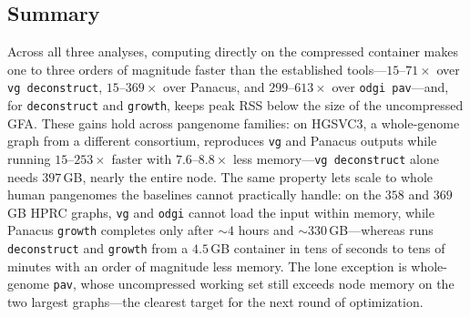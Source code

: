 \subsection*{Summary}

Across all three analyses, computing directly on the compressed container makes
\gfaz one to three orders of magnitude faster than the established tools---$15$--$71\times$
over \texttt{vg deconstruct}, $15$--$369\times$ over Panacus, and $299$--$613\times$
over \texttt{odgi pav}---and, for \texttt{deconstruct} and \texttt{growth}, keeps
peak RSS below the size of the uncompressed GFA. These gains hold across pangenome
families: on HGSVC3, a whole-genome graph from a different consortium, \gfaz
reproduces \texttt{vg} and Panacus outputs while running $15$--$253\times$ faster
with $7.6$--$8.8\times$ less memory---\texttt{vg deconstruct} alone needs $397$\,GB,
nearly the entire node. The same property lets \gfaz
scale to whole human pangenomes the baselines cannot practically handle: on the
$358$ and $369$\,GB HPRC graphs, \texttt{vg} and \texttt{odgi} cannot load the
input within memory, while Panacus \texttt{growth} completes only after
$\sim$$4$ hours and $\sim$$330$\,GB---whereas \gfaz runs \texttt{deconstruct} and
\texttt{growth} from a $4.5$\,GB container in tens of seconds to tens of minutes
with an order of magnitude less memory. The lone exception is whole-genome
\texttt{pav}, whose uncompressed working set still exceeds node memory on the two
largest graphs---the clearest target for the next round of optimization.
